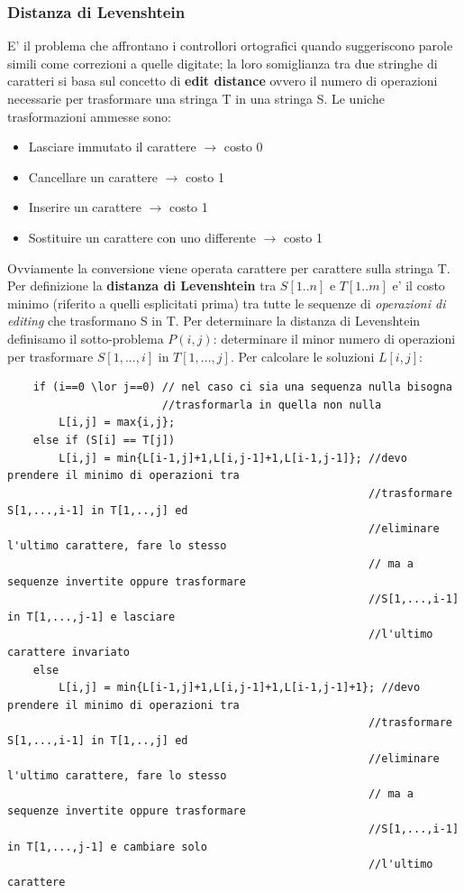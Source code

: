 \documentclass{article}
\begin{document}
\subsubsection{Distanza di Levenshtein}
E' il problema che affrontano i controllori ortografici quando suggeriscono parole simili come correzioni a quelle digitate;
la loro somiglianza tra due stringhe di caratteri si basa sul concetto di \textbf{edit distance} ovvero il numero di operazioni necessarie per trasformare una stringa T in una stringa S. 
Le uniche trasformazioni ammesse sono: \begin{itemize}
    \item Lasciare immutato il carattere   $\rightarrow$ costo 0
    \item Cancellare un carattere $\rightarrow$ costo 1
    \item Inserire un carattere $\rightarrow$ costo 1
    \item Sostituire un carattere con uno differente $\rightarrow$ costo 1
\end{itemize}
Ovviamente la conversione viene operata carattere per carattere sulla stringa T.
Per definizione la \textbf{distanza di Levenshtein} tra $S[1 .. n]$ e $T[1 .. m]$ e' il costo minimo (riferito a quelli esplicitati prima) tra tutte le sequenze di \textit{operazioni di editing} che trasformano S in T.
Per determinare la distanza di Levenshtein definisamo il sotto-problema $P(i,j)$: determinare il minor numero di operazioni per trasformare $S[1,...,i]$ in $T[1,...,j]$.
Per calcolare le soluzioni $L[i,j]$:
\begin{verbatim}
    if (i==0 \lor j==0) // nel caso ci sia una sequenza nulla bisogna 
                        //trasformarla in quella non nulla
        L[i,j] = max{i,j};
    else if (S[i] == T[j])
        L[i,j] = min{L[i-1,j]+1,L[i,j-1]+1,L[i-1,j-1]}; //devo prendere il minimo di operazioni tra 
                                                        //trasformare S[1,...,i-1] in T[1,..,j] ed 
                                                        //eliminare l'ultimo carattere, fare lo stesso
                                                        // ma a sequenze invertite oppure trasformare 
                                                        //S[1,...,i-1] in T[1,...,j-1] e lasciare 
                                                        //l'ultimo carattere invariato
    else
        L[i,j] = min{L[i-1,j]+1,L[i,j-1]+1,L[i-1,j-1]+1}; //devo prendere il minimo di operazioni tra 
                                                        //trasformare S[1,...,i-1] in T[1,..,j] ed 
                                                        //eliminare l'ultimo carattere, fare lo stesso
                                                        // ma a sequenze invertite oppure trasformare 
                                                        //S[1,...,i-1] in T[1,...,j-1] e cambiare solo 
                                                        //l'ultimo carattere
\end{verbatim}
\end{document}

